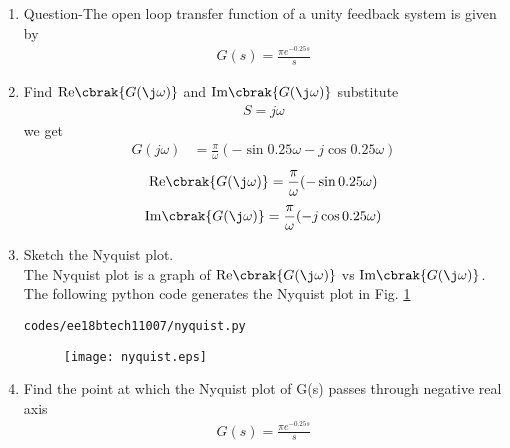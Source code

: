 \begin{enumerate}[label=\thesection.\arabic*.,ref=\thesection.\theenumi]

\item Question-The open loop transfer function of a unity feedback system is given by
\begin{align*}
 G(s)=\frac{\pi e^{-0.25s}}{s}
\end{align*}
\item Find  $\text{Re} \cbrak{G(\j \omega)}$ and  $\text{Im} \cbrak{G(\j \omega)}$
\newline
\solution 
substitute \begin{align}
S=j\omega
\end{align}
we get \begin{align}
G(j\omega)&=\frac{\pi}{\omega}(-\sin{0.25\omega}-j\cos{0.25\omega})
\end{align}
\begin{align}
 \text{Re} \cbrak{G(\j \omega)}=\frac{\pi}{\omega}(-\sin{0.25\omega}) 
\end{align}
\begin{align}
 \text{Im} \cbrak{G(\j \omega)}=\frac{\pi}{\omega}(-j\cos{0.25\omega}) 
\end{align}
\item Sketch the Nyquist plot.
\\
\solution The Nyquist plot is a graph of $\text{Re} \cbrak{G(\j \omega)}$  vs $\text{Im} \cbrak{G(\j \omega)}$.
The following python code generates the Nyquist plot in Fig.  \ref{fig:ee18btech11007}
\begin{lstlisting}
codes/ee18btech11007/nyquist.py
\end{lstlisting}
%
\begin{figure}[!h]
  \texttt{[image: nyquist.eps]}
  \caption{}
  \label{fig:ee18btech11007}
\end{figure}
%
\item Find the point at which the Nyquist plot of G(s) passes through negative real axis
\newline
\solution
\begin{align}
G(s)=\frac{\pi e^{-0.25s}}{s}
\end{align}


\end{enumerate}
